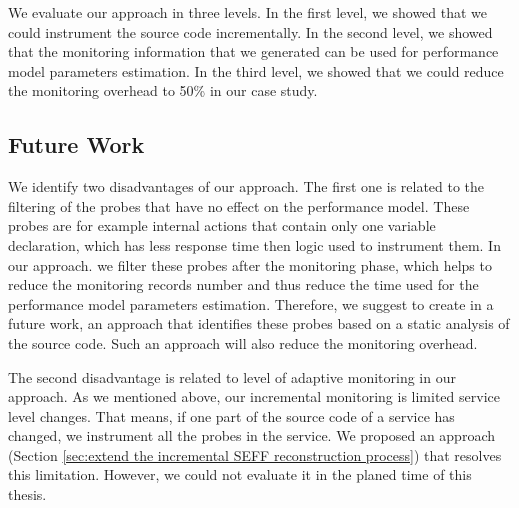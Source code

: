 We evaluate our approach in three levels. In the first level, we showed that we could instrument the source code incrementally. In the second level, we showed that the monitoring information that we generated can be used for performance model parameters estimation. In the third level, we showed that we could reduce the monitoring overhead to 50\% in our case study. 
   
\subsection{Future Work}
\label{sec:future work}
We identify two disadvantages of our approach. The first one is related to the filtering of the probes that have no effect on the performance model. These probes are for example internal actions that contain only one variable declaration, which has less response time then logic used to instrument them. In our approach. we filter these probes after the monitoring phase, which helps to reduce the monitoring records number and thus reduce the time used for the performance model parameters estimation. Therefore, we suggest to create in a future work, an approach that identifies these probes based on a static analysis of the source code. Such an approach will also reduce the monitoring overhead. 

The second disadvantage is related to level of adaptive monitoring in our approach. As we mentioned above, our incremental monitoring is limited service level changes. That means, if one part of the source code of a service has changed, we instrument all the probes in the service. We proposed an approach (Section \ref{sec:extend the incremental SEFF reconstruction process}) that resolves this limitation. However, we could not evaluate it in the planed time of this thesis.    